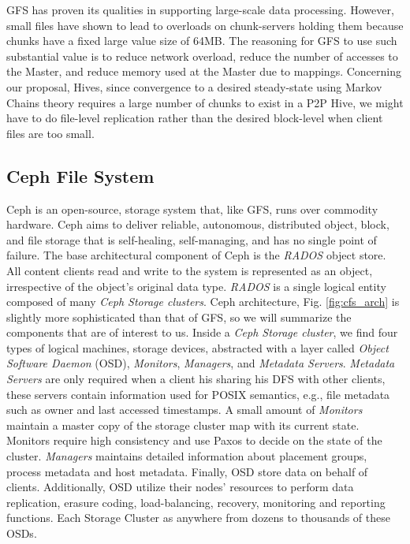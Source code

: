 \documentclass[runningheads]{llncs}
\begin{document}
GFS has proven its qualities in supporting large-scale data processing. However, small files have shown \cite{gfs} to lead to overloads on chunk-servers holding them because chunks have a fixed large value size of 64MB. The reasoning for GFS to use such substantial value is to reduce network overload, reduce the number of accesses to the Master, and reduce memory used at the Master due to mappings. Concerning our proposal, Hives, since convergence to a desired steady-state using Markov Chains theory requires a large number of chunks to exist in a P2P Hive, we might have to do file-level replication rather than the desired block-level when client files are too small.\newline

\newpage\subsection{Ceph File System}
Ceph \cite{ceph} is an open-source, storage system that, like GFS, runs over commodity hardware. Ceph aims to deliver reliable, autonomous, distributed object, block, and file storage that is self-healing, self-managing, and has no single point of failure. The base architectural component of Ceph is the \textit{RADOS} object store. All content clients read and write to the system is represented as an object, irrespective of the object's original data type. \textit{RADOS} is a single logical entity composed of many \textit{Ceph Storage clusters}. Ceph architecture, Fig. \ref{fig:cfs_arch} is slightly more sophisticated than that of GFS, so we will summarize the components that are of interest to us. Inside a \textit{Ceph Storage cluster}, we find four types of logical machines, storage devices, abstracted with a layer called \textit{Object Software Daemon} (OSD), \textit{Monitors}, \textit{Managers}, and \textit{Metadata Servers}. \textit{Metadata Servers} are only required when a client his sharing his DFS with other clients, these servers contain information used for POSIX semantics, e.g., file metadata such as owner and last accessed timestamps. A small amount of \textit{Monitors} maintain a master copy of the storage cluster map with its current state. Monitors require high consistency and use Paxos \cite{paxos} to decide on the state of the cluster. \textit{Managers} maintains detailed information about placement groups, process metadata and host metadata. Finally, OSD store data on behalf of clients. Additionally, OSD utilize their nodes' resources to perform data replication, erasure coding, load-balancing, recovery, monitoring and reporting functions. Each Storage Cluster as anywhere from dozens to thousands of these OSDs.
\end{document}
